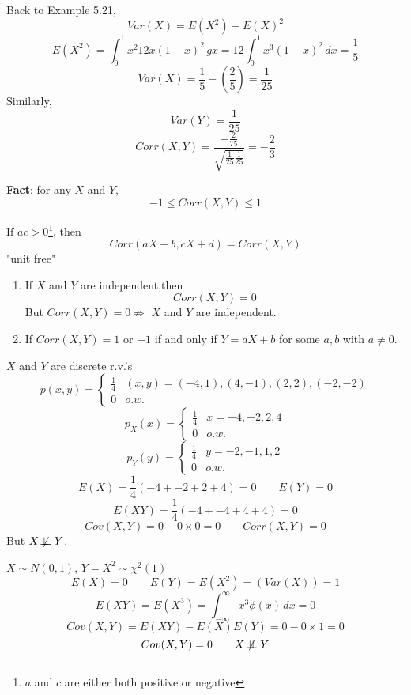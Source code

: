 Back to Example 5.21,
\[Var(X)=E(X^2)-{E(X)}^2\]
\[E(X^2)=\int_0^1 x^2 12x (1-x)^2 \,gx= 12\int_0^1 x^3 (1-x)^2 \,dx=\frac{1}{5}\]
\[Var(X)=\frac{1}{5}-\left(\frac{2}{5}\right)=\frac{1}{25}\]
Similarly, \[Var(Y)=\frac{1}{25}\]
\[Corr(X,Y)=\frac{-\frac{2}{75}}{\sqrt{\frac{1}{25}\frac{1}{25}}}=-\frac{2}{3}\]

\begin{prop}
\textbf{Fact}: for any $X$ and $Y$,
\[-1\leq Corr(X,Y)\leq 1\]
\end{prop}

\begin{prop}
If $ac >0$\footnote{$a$ and $c$ are either both positive or negative}, then
\[Corr(aX+b,cX+d)=Corr(X,Y)\]
"unit free" 
\end{prop}

\begin{prop}
\begin{enumerate}
\item If $X$ and $Y$ are independent,then
\[Corr(X,Y)=0\]
But $Corr(X,Y)=0 \not\Rightarrow$ $X$ and $Y$ are independent.
\item If $Corr(X,Y)=1$ or $-1$ if and only if $Y=aX+b$ for some $a,b$ with $a \neq 0$.
\end{enumerate}
\end{prop}

\begin{exmp}
$X$ and $Y$ are discrete r.v.'s
\[p(x,y)=\begin{cases}
\frac{1}{4} &(x,y)=(-4,1),(4,-1),(2,2),(-2,-2)\\
0 & o.w.
\end{cases}\]
\[p_X(x)=\begin{cases}
\frac{1}{4} &x=-4,-2,2,4\\
0 & o.w.
\end{cases}\]
\[p_Y(y)=\begin{cases}
\frac{1}{4} &y=-2,-1,1,2\\
0 & o.w.
\end{cases}\]
\[E(X)=\frac{1}{4}(-4+-2+2+4)=0 \qquad E(Y)=0\]
\[E(XY)=\frac{1}{4}(-4+-4+4+4)=0\]
\[Cov(X,Y)=0-0\times0=0 \qquad Corr(X,Y)=0\]
But $X  \not\!\perp\!\!\!\perp Y$.
\end{exmp}

\begin{exmp}
$X \sim N(0,1)$, $Y=X^2 \sim \chi^2 (1)$
\[E(X)=0 \qquad E(Y)=E(X^2)=(Var(X))=1\]
\[E(XY)=E(X^3)=\int_{-\infty}^{\infty}x^3 \phi(x)\,dx=0\]
\[Cov(X,Y)=E(XY)-E(X)E(Y)=0-0\times1=0\]
\[Cov(X,Y)=0 \qquad X  \not\!\perp\!\!\!\perp Y\]
\end{exmp}

